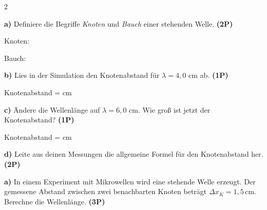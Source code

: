 \documentclass[11pt,a4paper]{article}
\begin{document}
\begin{multicols}{2}
\begin{tcolorbox}[colback=white,colframe=black,coltitle=black,colbacktitle=white,
    title=\textbf{1: Beobachtung der Superposition}]
\vspace{1.8cm}

\end{tcolorbox}

\begin{tcolorbox}[colback=white,colframe=black,coltitle=black,colbacktitle=white,
    title=\textbf{2: Knoten und Bäuche}]

\textbf{a)} Definiere die Begriffe \emph{Knoten} und \emph{Bauch} einer stehenden Welle. \textbf{(2P)}

\vspace{0.2cm}
Knoten: \hrulefill

\vspace{0.8cm}

Bauch: \hrulefill

\vspace{0.8cm}

\textbf{b)} Lies in der Simulation den Knotenabstand für $\lambda = 4{,}0$ cm ab. \textbf{(1P)}

\vspace{0.3cm}
Knotenabstand = \underline{\hspace{2cm}} cm

\vspace{0.3cm}

\textbf{c)} Ändere die Wellenlänge auf $\lambda = 6{,}0$ cm. Wie groß ist jetzt der Knotenabstand? \textbf{(1P)}

\vspace{0.3cm}
Knotenabstand = \underline{\hspace{2cm}} cm

\vspace{0.3cm}

\textbf{d)} Leite aus deinen Messungen die allgemeine Formel für den Knotenabstand her. \textbf{(2P)}

\vspace{1.5cm}

\end{tcolorbox}

\columnbreak

\begin{tcolorbox}[colback=white,colframe=black,coltitle=black,colbacktitle=white,
    title=\textbf{3: Wellenlängenbestimmung mit Mikrowellen}]

\textbf{a)} In einem Experiment mit Mikrowellen wird eine stehende Welle erzeugt. Der gemessene Abstand zwischen zwei benachbarten Knoten beträgt $\Delta x_K = 1{,}5\,\mathrm{cm}$. Berechne die Wellenlänge. \textbf{(3P)}


\end{tcolorbox}
\end{multicols}
\end{document}
